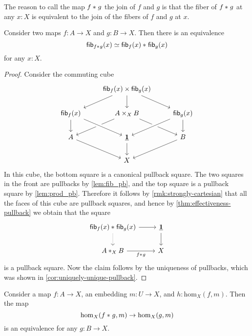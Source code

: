 The reason to call the map ${f}\ast_{}{g}$ the join of $f$ and $g$ is that the fiber of ${f}\ast_{}{g}$ at any $x:X$ is equivalent to the join of the fibers of $f$ and $g$ at $x$.

\begin{lem}
  Consider two maps $f:A\to X$ and $g:B\to X$. Then there is an equivalence
  \begin{equation*}
    \mathsf{fib}_{{f}\ast_{}{g}}(x)\simeq{\mathsf{fib}_{f}(x)}\ast_{}{\mathsf{fib}_{g}(x)}
  \end{equation*}
  for any $x:X$.
\end{lem}

\begin{proof}
  Consider the commuting cube
  \begin{equation*}
    \begin{tikzcd}
      & \fib{f}{x}\times\fib{g}{x} \arrow[dl] \arrow[dr] \arrow[d] \\
      \fib{f}{x} \arrow[d] & A\times_X B \arrow[dl] \arrow[dr] & \fib{g}{x} \arrow[d] \arrow[dl,crossing over] \\
      A \arrow[dr] & \unit \arrow[from=ul,crossing over] \arrow[d] & B \arrow[dl] \\
      & X
    \end{tikzcd}
  \end{equation*}
  In this cube, the bottom square is a canonical pullback square. The two squares in the front are pullbacks by \cref{lem:fib_pb}, and the top square is a pullback square by \cref{lem:prod_pb}. Therefore it follows by \cref{rmk:strongly-cartesian} that all the faces of this cube are pullback squares, and hence by \cref{thm:effectiveness-pullback} we obtain that the square
  \begin{equation*}
    \begin{tikzcd}
      \join{\fib{f}{x}}{\fib{g}{x}} \arrow[d,densely dotted] \arrow[r] & \unit \arrow[d] \\
      \join[X]{A}{B} \arrow[r,swap,"\join{f}{g}"] & X
    \end{tikzcd}
  \end{equation*}
  is a pullback square. Now the claim follows by the uniqueness of pullbacks, which was shown in \cref{cor:uniquely-unique-pullback}.
\end{proof}

\begin{lem}
Consider a map $f:A\to X$, an embedding $m:U\to X$, and $h:\mathrm{hom}_X(f,m)$. Then the map
\begin{equation*}
\mathrm{hom}_X({f}\ast_{}{g},m)\to \mathrm{hom}_X(g,m)
\end{equation*}
is an equivalence for any $g:B\to X$.
\end{lem}

